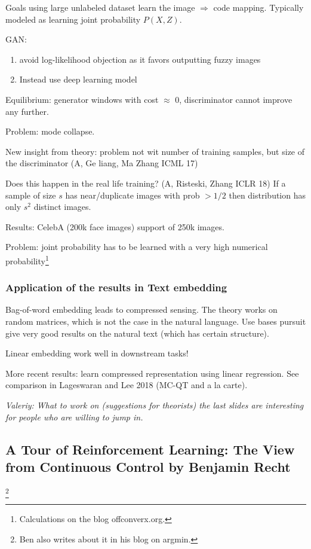 \documentclass[11pt,oneside,a4paper]{scrartcl}
\newcommand{\valeriy}[1]{{\color{blue}\textit{Valeriy: #1}}}
\begin{document}
Goals using large unlabeled dataset learn the image $\Rightarrow$
code mapping. Typically modeled as learning joint probability $P(X,Z)$.

GAN:
\begin{enumerate}
\item avoid log-likelihood objection as it favors outputting fuzzy images
  
\item Instead use deep learning model
\end{enumerate}

Equilibrium: generator windows with cost $\approx$ 0, discriminator cannot
improve any further.

Problem: mode collapse.

New insight from theory: problem not wit
number of training samples, but size of the discriminator (A, Ge
liang, Ma Zhang ICML 17)

Does this happen in the real life training? (A, Risteski, Zhang ICLR 18)
If a sample of size $s$ has near/duplicate images with prob $> 1/2$
 then distribution has only $s^2$ distinct images.

Results: CelebA (200k face images) support of 250k images.

Problem: joint probability has to be learned with a very high
numerical probability\footnote{Calculations on the blog
  offconverx.org.}

\subsubsection{Application of the results in Text embedding}
\label{sec:appl-results-text}

Bag-of-word embedding leads to compressed sensing. The theory works on
random matrices, which is not the case in the natural language. Use bases pursuit
give very good results on the natural text (which has certain structure).

Linear embedding work well in downstream tasks!

More recent results: learn compressed representation using linear
regression.  See comparison in Lageswaran and Lee 2018 (MC-QT and a
la carte). 

\valeriy{What to work on (suggestions for theorists) the last slides
  are interesting for people who are willing to jump in.}

\subsection{A Tour of Reinforcement Learning: The View from Continuous
  Control by Benjamin Recht}\footnote{Ben also writes about it in his
  blog on argmin.}
\label{sec:optimization-control}
\end{document}
